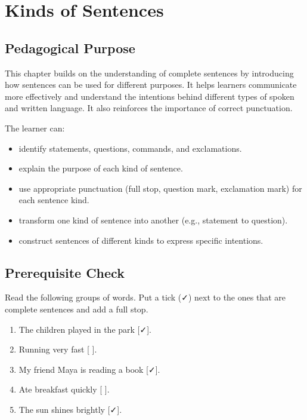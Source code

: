 
\chapter{Kinds of Sentences}

\section{Pedagogical Purpose}
This chapter builds on the understanding of complete sentences by introducing how sentences can be used for different purposes. It helps learners communicate more effectively and understand the intentions behind different types of spoken and written language. It also reinforces the importance of correct punctuation.

\begin{learningobjectives}
The learner can:
\begin{itemize}
    \item identify statements, questions, commands, and exclamations.
    \item explain the purpose of each kind of sentence.
    \item use appropriate punctuation (full stop, question mark, exclamation mark) for each sentence kind.
    \item transform one kind of sentence into another (e.g., statement to question).
    \item construct sentences of different kinds to express specific intentions.
\end{itemize}
\end{learningobjectives}

\section{Prerequisite Check}
\begin{quickcheck}
Read the following groups of words. Put a tick (✓) next to the ones that are complete sentences and add a full stop.
\begin{enumerate}
    \item The children played in the park [✓].
    \item Running very fast [ ].
    \item My friend Maya is reading a book [✓].
    \item Ate breakfast quickly [ ].
    \item The sun shines brightly [✓].
\end{enumerate}
\end{quickcheck}

